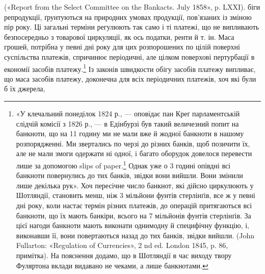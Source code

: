 («Report from the Select Committee on the Bankacts. July 1858»,
p. LXXI).
біги репродукції, ґрунтуються на природних умовах продукції,
пов’язаних із зміною пір року. Ці загальні терміни регулюють
так само і ті платежі, що не випливають безпосередньо з товарової
циркуляції, як ось податки, ренти й т. ін. Маса грошей, потрібна
у певні дні року для цих розпорошених по цілій поверхні суспільства
платежів, спричинює періодичні, але цілком поверхові пертурбації
в економії засобів платежу.\footnote{
«У клечальний понеділок 1824 р., — оповідає пан Креґ парламентській
слідчій комісії з 1826 р., — в Едінбурзі був такий величезний попит
на банкноти, що на 11 годину ми не мали вже й жодної банкноти в нашому
розпорядженні. Ми звертались по черзі до різних банків, щоб позичити
їх, але не мали змоги одержати ні одної, і багато оборудок довелося перевести
лише за допомогою slips of paper.\footnote*{
— шматків паперу. Ред.
} Однак уже о 3 годині опівдні
всі банкноти повернулись до тих банків, звідки вони вийшли. Вони змінили
лише декілька рук». Хоч пересічне число банкнот, які дійсно циркулюють
у Шотляндії, становить менш, ніж 3 мільйони фунтів стерлінґів,
все ж у певні дні року, коли настає термін різних платежів, до операцій
притягаються всі банкноти, що їх мають банкіри, всього на 7 мільйонів
фунтів стерлінґів. За цієї нагоди банкноти мають виконати однимодну
й специфічну функцію, і, виконавши її, вони повертаються назад
до тих банків, звідки вийшли. (John Fullarton: «Regulation of Currencies»,
2 nd ed. London 1845, p. 86, примітка). На пояснення додамо, що в Шотляндії
в час виходу твору Фуляртона вклади видавано не чеками, а лише
банкнотами.
} Із законів швидкости
обігу засобів платежу випливає, що маса засобів платежу, доконечна
для всіх періодичних платежів, хоч які були б їх джерела,
